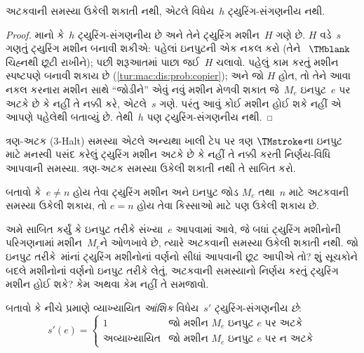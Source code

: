 \begin{thm}
 અટકવાની સમસ્યા ઉકેલી
શકાતી નથી, એટલે વિધેય~$h$ ટ્યુરિંગ-સંગણનીય નથી.
\end{thm}

\begin{proof}
માનો કે~$h$ ટ્યુરિંગ-સંગણનીય છે અને તેને ટ્યુરિંગ
મશીન~$H$ ગણે છે. $H$ વડે~$s$ ગણતું ટ્યુરિંગ મશીન
બનાવી શકીએ: પહેલાં ઇનપુટની એક નકલ કરો (તેને
~$\TMblank$ ચિહ્નથી છૂટી રાખીને); પછી શરૂઆતમાં
પાછા જઈ~$H$ ચલાવો. પહેલું કામ કરતું મશીન સ્પષ્ટપણે
બનાવી શકાય છે (\cref{tur:mac:dis:prob:copier});
અને જો $H$ હોત, તો તેને આવા નકલ કરનારા મશીન સાથે
``જોડીને'' એવું નવું મશીન મેળવી શકાત જે~$M_e$
ઇનપુટ~$e$ પર અટકે છે કે નહીં તે નક્કી કરે, એટલે~$s$
ગણે. પરંતુ આવું કોઈ મશીન હોઈ શકે નહીં એ આપણે પહેલેથી
બતાવ્યું છે. તેથી~$h$ પણ ટ્યુરિંગ-સંગણનીય નથી.
\end{proof}

\begin{prob}
ત્રણ-અટક (3-Halt) સમસ્યા એટલે અન્યથા ખાલી ટેપ પર
ત્રણ $\TMstroke$ના ઇનપુટ માટે મનસ્વી પસંદ કરેલું
ટ્યુરિંગ મશીન અટકે છે કે નહીં તે નક્કી કરતી નિર્ણય-વિધિ
આપવાની સમસ્યા. ત્રણ-અટક સમસ્યા ઉકેલી શકાતી નથી
તે સાબિત કરો.
\end{prob}

\begin{prob}
બતાવો કે~$e \neq n$ હોય તેવા ટ્યુરિંગ મશીન અને ઇનપુટ
જોડ $M_e$ તથા~$n$ માટે અટકવાની સમસ્યા ઉકેલી શકાય,
તો $e = n$ હોય તેવા કિસ્સાઓ માટે પણ ઉકેલી શકાય છે.
\end{prob}

\begin{prob}
અમે સાબિત કર્યું કે ઇનપુટ તરીકે સંખ્યા~$e$ આપવામાં આવે,
જે બધાં ટ્યુરિંગ મશીનોની પરિગણનામાં મશીન~$M_e$ને
ઓળખાવે છે, ત્યારે અટકવાની સમસ્યા ઉકેલી શકાતી નથી.
જો ઇનપુટ તરીકે~માંનાં
ટ્યુરિંગ મશીનોનાં વર્ણનો સીધાં આપવાની છૂટ આપીએ તો?
શું સૂચકોને બદલે મશીનોનાં વર્ણનો ઇનપુટ તરીકે લેતું,
અટકવાની સમસ્યાનો નિર્ણય કરતું ટ્યુરિંગ મશીન હોઈ
શકે? કેમ અથવા કેમ નહીં તે સમજાવો.
\end{prob}

\begin{prob} બતાવો કે નીચે પ્રમાણે વ્યાખ્યાયિત
  \emph{આંશિક} વિધેય~$s'$ ટ્યુરિંગ-સંગણનીય \emph{છે}:
  \[
  s'(e) =
  \begin{cases}
    \text{1} & \text{જો મશીન~$M_e$ ઇનપુટ $e$ પર અટકે}\\
    \text{અવ્યાખ્યાયિત} & \text{જો મશીન~$M_e$ ઇનપુટ $e$ પર ન અટકે}
  \end{cases}
  \]
\end{prob}
\endgroup



